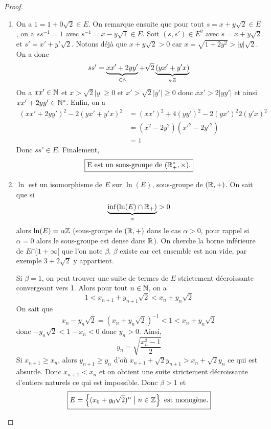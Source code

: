 \documentclass[12pt]{article}
\begin{document}
\begin{proof}
	\phantom{}
	\begin{enumerate}
		\item On a $1=1+0\sqrt{2}\in E$. On remarque ensuite que pour tout $s=x+y\sqrt{2}\in E$, on a $ss^{-1}=1$ avec $s^{-1}=x-y\sqrt{1}\in E$. Soit $(s,s')\in E^{2}$ avec $s=x+y\sqrt{2}$ et $s'=x'+y'\sqrt{2}$. Notons déjà que $x+y\sqrt{2}>0$ car $x=\sqrt{1+2y^{2}}>\vert y\vert\sqrt{2}$.
		On a donc
		\begin{equation}
			ss'=\underbrace{xx'+2yy'}_{\in\mathbb{Z}}+\sqrt{2}\underbrace{(yx'+y'x)}_{\in\mathbb{Z}}
		\end{equation}
		On a $xx'\in\mathbb{N}$ et $x>\sqrt{2}\vert y\vert\geqslant0$ et $x'>\sqrt{2}\vert y'\vert\geqslant0$ donc $xx'>2\vert yy'\vert$ et ainsi $xx'+2yy'\in\mathbb{N}^{*}$. Enfin, on a 
		\begin{align}
			(xx'+2yy')^{2}-2(yx'+y'x)^{2}
			&=(xx')^{2}+4(yy')^{2}-2(yx')^{2}2(y'x)^{2}\\
			&=(x^{2}-2y^{2})(x'^{2}-2y'^{2})\\
			&=1
		\end{align}
		Donc $ss'\in E$. Finalement, 
		\begin{equation}
			\boxed{\text{E est un sous-groupe de }(\mathbb{R}_{+}^{*},\times).}
		\end{equation}

		\item $\ln$ est un isomorphisme de $E$ sur $\ln(E)$, sous-groupe de $(\mathbb{R},+)$. On sait que si 
		\begin{equation}
			\underbrace{\inf(\ln(E)\cap\mathbb{R}_{+})}_{\alpha}>0
		\end{equation}
		alors $\ln(E)=\alpha\mathbb{Z}$ (sous-groupe de $(\mathbb{R},+)$ dans le cas $\alpha>0$, pour rappel si $\alpha=0$ alors le sous-groupe est dense dans $\mathbb{R}$). On cherche la borne inférieure de $E\cap]1+\infty[$ que l'on note $\beta$. $\beta$ existe car cet ensemble est non vide, par exemple $3+2\sqrt{2}$ y appartient.
		
		Si $\beta=1$, on peut trouver une suite de termes de $E$ strictement décroissante convergeant vers 1. Alors pour tout $n\in\mathbb{N}$, on a 
		\begin{equation}
			1<x_{n+1}+y_{n+1}\sqrt{2}<x_{n}+y_{n}\sqrt{2}
		\end{equation}
		On sait que 
		\begin{equation}
			x_{n}-y_{n}\sqrt{2}=(x_{n}+y_{n}\sqrt{2})^{-1}<1<x_{n}+y_{n}\sqrt{2}
		\end{equation}
		donc $-y_{n}\sqrt{2}<1-x_{n}<0$ donc $y_{n}>0$. Ainsi, 
		\begin{equation}
			y_{n}=\sqrt{\frac{x_{n}^{2}-1}{2}}
		\end{equation}
		Si $x_{n+1}\geqslant x_{n}$, alors $y_{n+1}\geqslant y_{n}$ d'où $x_{n+1}+\sqrt{2}y_{n+1}>x_{n}+\sqrt{2}y_{n}$ ce qui est absurde. Donc $x_{n+1}<x_{n}$ et on obtient une suite strictement décroissante d'entiers naturels ce qui est impossible. Donc $\beta>1$ et 
		\begin{equation}
			\boxed{E=\left\{(x_{0}+y_{0}\sqrt{2})^{n}\bigm| n\in\mathbb{Z}\right\}\text{ est monogène.}}
		\end{equation}


\end{enumerate}
\end{proof}
\end{document}
